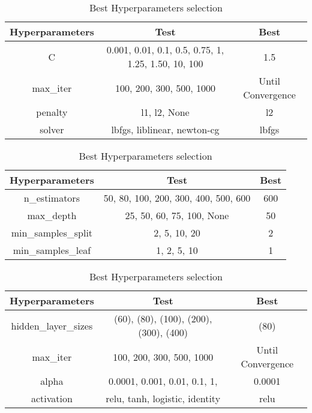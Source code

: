 \begin{table}[H]
	\centering
	\small
	\begin{tabular}{|c|c|c|}
		\hline
		\textbf{Hyperparameters}                    & \textbf{Test} & \textbf{Best} \\
		\hline
		C                                   & 0.001, 0.01, 0.1, 0.5, 0.75, 1, 1.25, 1.50, 10, 100                & 1.5          \\
		max_iter                            & 100, 200, 300, 500, 1000               & Until Convergence          \\
		penalty                             & l1, l2, None               & l2          \\
		solver                              & lbfgs, liblinear, newton-cg               & lbfgs         \\
		\hline
	\end{tabular}
	\caption{Best Hyperparameters selection}
	\label{best}
\end{table}

\begin{table}[H]
	\centering
	\small
	\begin{tabular}{|c|c|c|}
		\hline
		\textbf{Hyperparameters}                    & \textbf{Test} & \textbf{Best} \\
		\hline
		n_estimators                                   & 50, 80, 100, 200, 300, 400, 500, 600              & 600          \\
		max_depth                        & 25, 50, 60, 75, 100, None             & 50        \\
		min_samples_split                           & 2, 5, 10, 20              & 2          \\
		min_samples_leaf                              & 1, 2, 5, 10            & 1         \\
		\hline
	\end{tabular}
	\caption{Best Hyperparameters selection}
	\label{best}
\end{table}

\begin{table}[H]
	\centering
	\small
	\begin{tabular}{|c|c|c|}
		\hline
		\textbf{Hyperparameters}                    & \textbf{Test} & \textbf{Best} \\
		\hline
		hidden_layer_sizes                               & (60), (80), (100), (200), (300), (400)                & (80)          \\
		max_iter                            & 100, 200, 300, 500, 1000               & Until Convergence \\
		alpha                             & 0.0001, 0.001, 0.01, 0.1, 1,               & 0.0001         \\
		activation                              & relu, tanh, logistic, identity              & relu         \\
		\hline
	\end{tabular}
	\caption{Best Hyperparameters selection}
	\label{best}
\end{table}